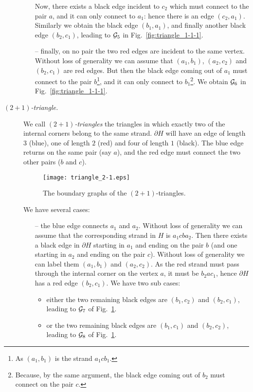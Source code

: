 \documentclass[10pt]{article}
\theoremstyle{plain}
\theoremstyle{definition}
\newcommand{\cG}{{\cal G}}
\begin{document}
\begin{description}
\begin{itemize}
 Now, there exists a black edge incident to $c_2$ which must connect to the pair $a$, and it can only connect to $a_1$: hence there is an edge $(c_2,a_1)$. Similarly we obtain the black edge $(b_1,a_1)$, and finally another
 black edge $(b_2,c_1)$, leading to $\cG_5$ in Fig.~\ref{fig:triangle_1-1-1}.
 \item[--]  finally, on no pair the two red edges are incident to the same  vertex.  Without loss of generality we can assume that $(a_1,b_1)$, $(a_2,c_2)$ and $(b_2,c_1)$ are red edges. But then
  the black edge coming out of $a_1$ must connect to the pair $b$\footnote{As $(a_1,b_1)$ is the strand $a_1cb_1$.}, and it can only connect to $b_1$\footnote{Because, by the same argument, the black edge coming out of $b_2$ must connect on the pair $c$.}. 
  We obtain $\cG_6$ in Fig.~\ref{fig:triangle_1-1-1}.
\end{itemize}
 \item[\it $(2+1)$-triangle.]
We call \emph{$(2+1)$-triangles} the triangles in which exactly two of the internal corners belong to the same strand.
$\partial H$ will have an edge of length 3 (blue), one of length $2$ (red) and four of length $1$ (black).
The blue edge returns on the same pair (say $a$), and the red edge must connect the two other pairs ($b$ and $c$).
 \begin{figure}[htb]
 \begin{center}
 \texttt{[image: triangle\_2-1.eps]}  
 \caption{The boundary graphs of the $(2+1)$-triangles.} \label{fig:triangle_2-1}
 \end{center}
 \end{figure}
We have several cases: 
\begin{itemize}
 \item[--] the blue edge connects $a_1$ and $a_2$. Without loss of generality we can assume that the corresponding strand in $H$ is $a_1cba_2$. 
 Then there exists a black edge in $\partial H$ starting in $a_1$ and ending on the pair $b$ (and one starting in $a_2$ and ending on the pair $c$). 
 Without loss of generality we can label them $(a_1,b_1)$ and $(a_2,c_2)$. As the red strand must pass through the internal corner on the vertex $a$,
 it must be $b_2 a c_1$, hence $\partial H$ has a red edge $(b_2,c_1)$. We have two sub cases:
 \begin{itemize}
  \item either the two remaining black edges are $(b_1, c_2)$ and $(b_2, c_1)$, leading to $\cG_7$ of Fig.~\ref{fig:triangle_2-1}.     
  \item or the two remaining black edges are $(b_1, c_1)$ and $(b_2, c_2)$, leading to $\cG_8$ of Fig.~\ref{fig:triangle_2-1}.

\end{itemize}
\end{itemize}
\end{description}
\end{document}

